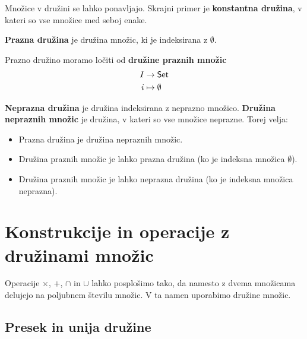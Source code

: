 \begin{zgled}
  Množice v družini se lahko ponavljajo. Skrajni primer je \textbf{konstantna družina}, v kateri so vse množice med seboj enake.
\end{zgled}

\begin{zgled}
  \textbf{Prazna družina} je družina množic, ki je indeksirana z $\emptyset$.
\end{zgled}

\begin{zgled}
  Prazno družino moramo ločiti od \textbf{družine praznih množic}
  \begin{align*}
    I &\to \mathsf{Set} \\
    i &\mapsto \emptyset
  \end{align*}
\end{zgled}

\begin{zgled}
  \textbf{Neprazna družina} je družina indeksirana z neprazno množico.
  \textbf{Družina nepraznih množic} je družina, v kateri so vse množice neprazne.
  Torej velja:
  \begin{itemize}
  \item Prazna družina je družina nepraznih množic.
  \item Družina praznih množic je lahko prazna družina (ko je indeksna množica $\emptyset$).
  \item Družina praznih množic je lahko neprazna družina (ko je indeksna množica neprazna).
  \end{itemize}
\end{zgled}


\section{Konstrukcije in operacije z družinami množic}

Operacije $\times$, $+$, $\cap$ in $\cup$ lahko posplošimo tako, da namesto z dvema
množicama delujejo na poljubnem številu množic. V ta namen uporabimo družine
množic.

\subsection{Presek in unija družine}

